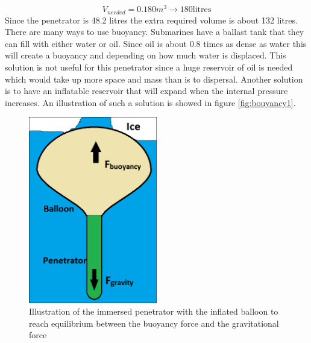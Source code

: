 \begin{equation}
V_{needed} = 0.180 m^3 \rightarrow 180 \text{litres}
\end{equation}
Since the penetrator is 48.2 litres the extra required volume is about 132 litres. There are many ways to use buoyancy. Submarines have a ballast tank that they can fill with either water or oil. Since oil is about 0.8 times as dense as water this will create a buoyancy and depending on how much water is displaced. This solution is not useful for this penetrator since a huge reservoir of oil is needed which would take up more space and mass than is to dispersal. Another solution is to have an inflatable reservoir that will expand when the internal pressure increases. An illustration of such a solution is showed in figure \ref{fig:bouyancy1}.
\begin{figure}[htb]
  \centering
  \includegraphics[width=0.5\textwidth]{figures/Ricardo/Buoyancy1.png}
  \caption{Illustration of the immersed penetrator with the inflated balloon to reach equilibrium between the buoyancy force and the gravitational force}
  \label{fig:buoyancy1}
\end{figure}
